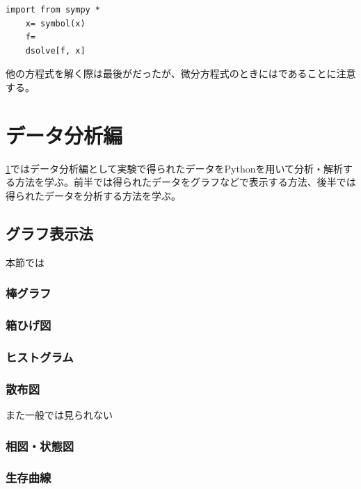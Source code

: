 \documentclass[dvipdfmx, leqno]{jsreport}
\begin{document}
\begin{lstlisting}[caption= {Pythonで微分方程式を解く}, label= {Pythonで微分方程式を解く}]
    import from sympy *
    x= symbol(x)
    f= 
    dsolve[f, x]
\end{lstlisting}
    他の方程式を解く際は最後がだったが、微分方程式のときにはであることに注意する。


\chapter{データ分析編}\label{chap:データ分析編}
    \cref{chap:データ分析編}ではデータ分析編として実験で得られたデータをPythonを用いて分析・解析する方法を学ぶ。前半では得られたデータをグラフなどで表示する方法、後半では得られたデータを分析する方法を学ぶ。

\section{グラフ表示法}
    本節では

\subsection{棒グラフ}%

\subsection{箱ひげ図}%

\subsection{ヒストグラム}%

\subsection{散布図}%

    また一般では見られない
\subsection{相図・状態図}%

\subsection{生存曲線}%
\end{document}
